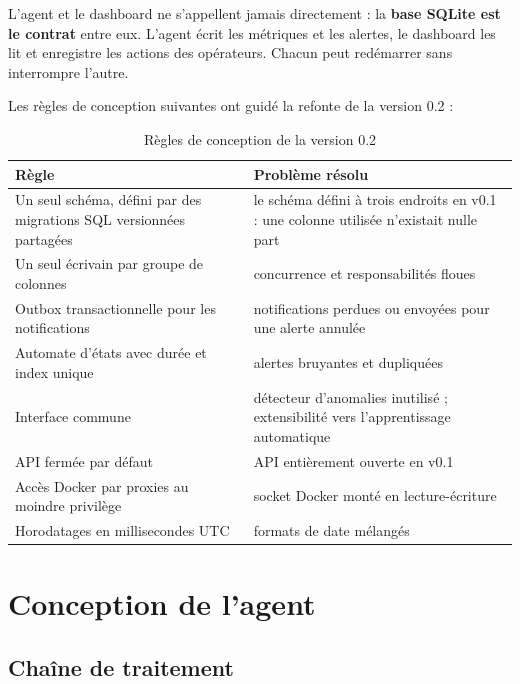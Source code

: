 \begin{aretenir}
L'agent et le dashboard ne s'appellent jamais directement : la \textbf{base SQLite est le
contrat} entre eux. L'agent écrit les métriques et les alertes, le dashboard les lit et
enregistre les actions des opérateurs. Chacun peut redémarrer sans interrompre l'autre.
\end{aretenir}

Les règles de conception suivantes ont guidé la refonte de la version 0.2 :

\begin{table}[htbp]
\centering
\small
\begin{tabularx}{\linewidth}{L{5cm}Y}
\toprule
\textbf{Règle} & \textbf{Problème résolu} \\
\midrule
Un seul schéma, défini par des migrations SQL versionnées partagées & le schéma défini à trois endroits en v0.1 : une colonne utilisée n'existait nulle part \\
Un seul écrivain par groupe de colonnes & concurrence et responsabilités floues \\
Outbox transactionnelle pour les notifications & notifications perdues ou envoyées pour une alerte annulée \\
Automate d'états avec durée et index unique & alertes bruyantes et dupliquées \\
Interface  commune & détecteur d'anomalies inutilisé ; extensibilité vers l'apprentissage automatique \\
API fermée par défaut & API entièrement ouverte en v0.1 \\
Accès Docker par proxies au moindre privilège & socket Docker monté en lecture-écriture \\
Horodatages en millisecondes UTC & formats de date mélangés \\
\bottomrule
\end{tabularx}
\caption{Règles de conception de la version 0.2}
\label{tab:regles-conception}
\end{table}

\section{Conception de l'agent}

\subsection{Chaîne de traitement}

